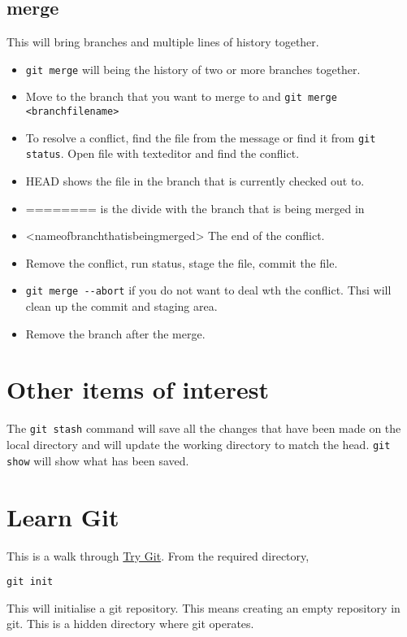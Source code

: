 \documentclass[11pt]{article} %
\begin{document}
\subsection{merge}
This will bring branches and multiple lines of history together. 
\begin{itemize}
\item \lstinline{git merge} will being the history of two or more branches together. 
\item Move to the branch that you want to merge to and \lstinline{git merge <branchfilename>} 
\item To resolve a conflict, find the file from the message or find it from \lstinline{git status}. Open file with texteditor and find the conflict. 
\item \verbatim{<<<<}HEAD shows the file in the branch that is currently checked out to.
\item ======== is the divide with the branch that is being merged in
\item \verbatim{>>>>>>} <nameofbranchthatisbeingmerged>  The end of the conflict. 
\item Remove the conflict, run status, stage the file, commit the file.
\item \lstinline{git merge --abort} if you do not want to deal wth the conflict. Thsi will clean up the commit and staging area. 
\item Remove the branch after the merge. 
\end{itemize}



\section{Other items of interest}
The \lstinline{git stash} command will save all the changes that have been made on the local directory and will update the working directory to match the head.
\lstinline{git show} will show what has been saved. 
\section{Learn Git}
This  is a walk through \href{http://try.github.io}{Try Git}.  
From the required directory, 
\begin{lstlisting}
git init
\end{lstlisting}

This will initialise a git repository. This means creating an empty repository in git.  This is a hidden directory where git operates. 
\end{document}
